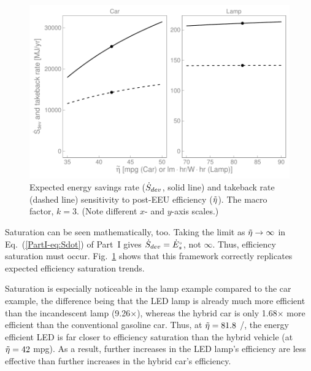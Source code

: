 \documentclass[12pt]{article}\usepackage[]{graphicx}\usepackage[]{xcolor}
\makeatletter
\def\maxwidth{ %
  \ifdim\Gin@nat@width>\linewidth
    \linewidth
  \else
    \Gin@nat@width
  \fi
}
\newenvironment{knitrout}{}{} %
\makeatother
\begin{document}
\begin{knitrout}
\color{fgcolor}\begin{figure}

{\centering \includegraphics[width=\maxwidth]{figure/eta_tilde_takeback_Sdot_sens_graph-1} 

}

\caption[Expected energy savings rate ($\Sdot$, solid line) and takeback rate (dashed line) sensitivity to post-EEU efficiency ($\amacro{\eta}$)]{Expected energy savings rate ($\Sdot$, solid line) and takeback rate (dashed line) sensitivity to post-EEU efficiency ($\amacro{\eta}$). The macro factor, $k = 3$. (Note different $x$- and $y$-axis scales.)}\label{fig:eta_tilde_takeback_Sdot_sens_graph}
\end{figure}

\end{knitrout}
  
  
Saturation can be seen mathematically, too.
Taking the limit as $\tilde{\eta} \rightarrow \infty$ 
in Eq.~(\ref{PartI-eq:Sdot}) of Part~I gives $\dot{S}_{dev} = {}{\dot{E}}^{\scriptscriptstyle \circ}_s$, 
not $\infty$. 
Thus, efficiency saturation must occur.
Fig.~\ref{fig:eta_tilde_takeback_Sdot_sens_graph}
shows that this framework correctly replicates
expected efficiency saturation trends.

Saturation is especially noticeable in the lamp example
compared to the car example,
the difference being that 
the LED lamp is already much more efficient than the incandescent lamp
(9.26$\times$),
whereas the hybrid car is only 
1.68$\times$ more efficient than the conventional gasoline car. 
Thus, at $\tilde{\eta} = 81.8$ \lmhr/\Whr, 
the energy efficient LED
is far closer to efficiency saturation than the hybrid vehicle 
(at $\tilde{\eta} = 42$ mpg).
As a result, further increases in the LED lamp's efficiency 
are less effective than further increases in the hybrid car's efficiency.
\end{document}
